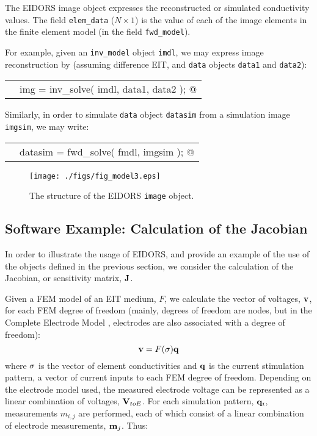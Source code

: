 \documentclass[12pt]{iopart}
\makeatletter
\newcommand{\CODEstart}{\medskip\begin{tabular}{ll}}
\newcommand{\CN}{\tt\scriptsize} %
\newcommand{\CC}{&\small\verb@}   % start code
\newcommand{\CODEend}{\end{tabular}\medskip}
\makeatother
\begin{document}
The EIDORS image object expresses the reconstructed or
simulated conductivity values. The field {\tt elem\_data}
($N\times1$) is the value of each of the image elements in 
the finite element model (in the field {\tt fwd\_model}).

For example, given
an {\tt inv\_model} object {\tt imdl}, we may express
image reconstruction by (assuming
difference EIT, and {\tt data} objects {\tt data1} and {\tt data2}):

\CODEstart
\CN    \CC img = inv_solve( imdl, data1, data2 ); @\\[-3pt]
\CODEend

Similarly, in order to simulate {\tt data} object {\tt datasim}
from a simulation image {\tt imgsim}, we may write:

\CODEstart
\CN    \CC datasim = fwd_solve( fmdl, imgsim ); @\\[-3pt]
\CODEend

%
%
\begin{figure}[th]
\begin{flushright}
\texttt{[image: ./figs/fig\_model3.eps]}
\caption{\small The structure of the EIDORS {\tt image} object.
\label{fig:image}
 }
\end{flushright}
\end{figure}


\subsection{Software Example: Calculation of the Jacobian}

In order to illustrate the usage of EIDORS, and provide
an example of the use of the objects defined in the previous
section, we consider
the calculation of the Jacobian, or sensitivity matrix,
$\bf J$.

Given a FEM  model of an EIT medium,
$F$, we calculate the vector of voltages, $\bf v$, 
for each FEM degree of freedom
 (mainly, degrees of freedom are nodes, but in the
 Complete Electrode Model \cite{Cheng_etal_1989},
 electrodes are also associated
 with a degree of freedom):
\begin{equation}
{\bf v} = F({\bf \sigma}){\bf q} 
\end{equation}
where $\bf \sigma$ is the vector of element conductivities
and $\bf q$ is the current stimulation pattern, a vector
of current inputs to each FEM degree of freedom.
Depending on the electrode model used, the measured electrode
voltage can be represented as a linear combination of 
voltages, ${\bf V}_{toE}$.
For each simulation pattern, ${\bf q}_{i}$,
measurements $m_{i,j}$
are performed, each of which consist of a linear combination of
electrode measurements, ${\bf m}_j$.
Thus:
\end{document}
